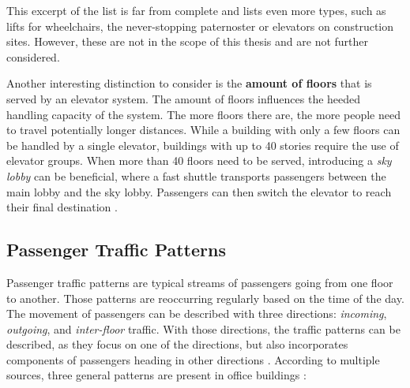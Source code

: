 This excerpt of the list is far from complete and \textcite[][pp.~141--158]{unger2015aufzuege} lists even more types, 
such as lifts for wheelchairs, the never-stopping paternoster or elevators on construction sites.
However, these are not in the scope of this thesis and are not further considered.

Another interesting distinction to consider is the \textbf{amount of floors} that is served by an elevator system.
The amount of floors influences the heeded handling capacity of the system.
The more floors there are, the more people need to travel potentially longer distances.
While a building with only a few floors can be handled by a single elevator,
buildings with up to 40 stories require the use of elevator groups.
When more than 40 floors need to be served, 
introducing a \emph{sky lobby} can be beneficial, 
where a fast shuttle transports passengers between the main lobby and the sky lobby. Passengers can then switch the elevator to reach their final destination \autocite[][p.~9]{hakonen2003simulation}.


\subsection{Passenger Traffic Patterns}
Passenger traffic patterns are typical streams of passengers going from one floor to another.
Those patterns are reoccurring regularly based on the time of the day.
The movement of passengers can be described with three directions: \emph{incoming}, \emph{outgoing}, and \emph{inter-floor} traffic.
With those directions, the traffic patterns can be described, as they focus on one of the directions, but also incorporates components of passengers heading in other directions \autocite[][p.~259]{siikonen1993simulation}.
According to multiple sources, three general patterns are present in office buildings \autocite[][pp.~1--2]{beers2015arrivals}
\autocite[][pp.~6--7]{axelsson2013strategies}
\autocite[][p.~194]{unger2015aufzuege}
\autocite[][p.~14]{siikonen1997models}:

